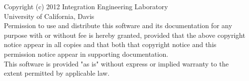 \newpage
\noindent
Copyright (c) 2012 Integration Engineering Laboratory\\
University of California, Davis \\
\newline
Permission to use and distribute this software and its
documentation for any purpose with or without fee is hereby granted,
provided that the above copyright notice appear in all copies and
that both that copyright notice and this permission notice appear
in supporting documentation.\\
\newline
This software is provided "as is" without express or implied warranty
to the extent permitted by applicable law.
